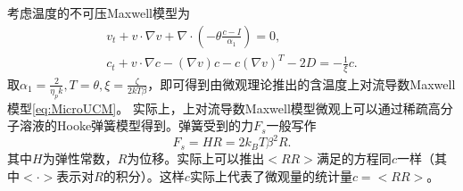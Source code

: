 	考虑温度的不可压Maxwell模型为
	\begin{eqnarray*}%
		v_t + v \cdot \nabla v + \nabla \cdot (-\theta \frac{c-I}{\alpha_1}) = 0, \\
		c_t + v \cdot \nabla c - (\nabla v) c - c (\nabla v)^T - 2 D = -\frac{1}{\xi} c.
	\end{eqnarray*}
	取$\alpha_1 = \frac{2}{\eta_p k}, T = \theta,\xi = \frac{\zeta}{2 kT \beta}$，即可得到由微观理论推出的含温度上对流导数Maxwell模型\eqref{eq:MicroUCM}。	实际上，上对流导数Maxwell模型微观上可以通过稀疏高分子溶液的Hooke弹簧模型得到\cite{larson1999structure,le2009multiscale}。弹簧受到的力$F_s$一般写作
	\begin{equation*}
		F_s = H R = 2 k_B T \beta^2 R.
	\end{equation*}
	其中$H$为弹性常数，$R$为位移。实际上可以推出$<RR>$满足的方程同$c$一样（其中$<\cdot>$表示对$R$的积分）。这样$c$实际上代表了微观量的统计量$c = <RR>$。

	

